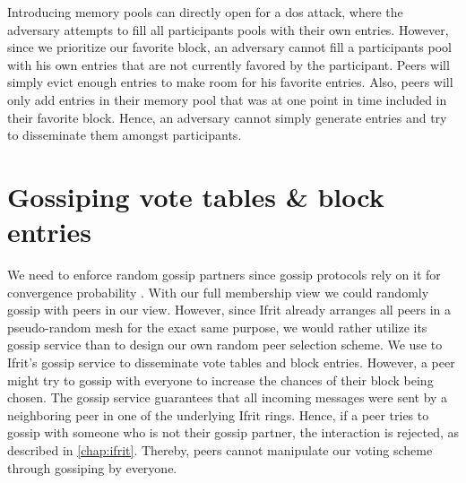 \documentclass[USenglish]{uit-thesis}
\begin{document}
Introducing memory pools can directly open for a \gls{dos} attack, where the adversary attempts to fill all participants pools with their own entries.
However, since we prioritize our favorite block, an adversary cannot fill a participants pool with his own entries that are not currently favored by the participant.
Peers will simply evict enough entries to make room for his favorite entries.
Also, peers will only add entries in their memory pool that was at one point in time included in their favorite block.
Hence, an adversary cannot simply generate entries and try to disseminate them amongst participants.
  
   



\section{Gossiping vote tables \& block entries}

We need to enforce random gossip partners since gossip protocols rely on it for convergence probability \cite{gossip_promise}.
With our full membership view we could randomly gossip with peers in our view. 
However, since Ifrit already arranges all peers in a pseudo-random mesh for the exact same purpose, we would rather utilize its gossip service than to design our own random peer selection scheme.
We use to Ifrit's gossip service to disseminate vote tables and block entries.
However, a peer might try to gossip with everyone to increase the chances of their block being chosen.
The gossip service guarantees that all incoming messages were sent by a neighboring peer in one of the underlying Ifrit rings.
Hence, if a peer tries to gossip with someone who is not their gossip partner, the interaction is rejected, as described in \autoref{chap:ifrit}.
Thereby, peers cannot manipulate our voting scheme through gossiping by everyone.
\end{document}
